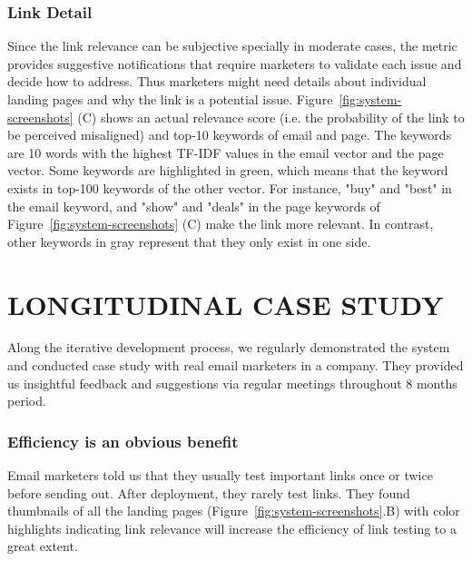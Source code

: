 \documentclass{sigchi}
\begin{document}
\subsubsection{Link Detail}
Since the link relevance can be subjective specially in moderate cases, the metric provides suggestive notifications that require marketers to validate each issue and decide how to address. Thus marketers might need details about individual landing pages and why the link is a potential issue. Figure~\ref{fig:system-screenshots} (C) shows an actual relevance score (i.e. the probability of the link to be perceived misaligned) and top-10 keywords of email and page. The keywords are 10 words with the highest TF-IDF values in the email vector and the page vector. Some keywords are highlighted in green, which means that the keyword exists in top-100 keywords of the other vector. For instance, "buy" and "best" in the email keyword, and "show" and "deals" in the page keywords of Figure~\ref{fig:system-screenshots} (C) make the link more relevant. In contrast, other keywords in gray represent that they only exist in one side. 





\section{LONGITUDINAL CASE STUDY}
Along the iterative development process, we regularly demonstrated the system and conducted case study with real email marketers in a company. They provided us insightful feedback and suggestions via regular meetings throughout 8 months period. 

\subsubsection{Efficiency is an obvious benefit}
Email marketers told us that they usually test important links once or twice before sending out. After deployment, they rarely test links. They found thumbnails of all the landing pages (Figure~\ref{fig:system-screenshots}.B) with color highlights indicating link relevance will increase the efficiency of link testing to a great extent.  
\end{document}
